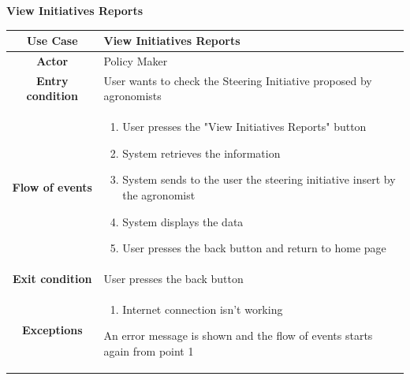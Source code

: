 \documentclass[table, 12pt]{article}
\begin{document}
\begin{itemize}
            \begin{table}[H]
                \item[] \textbf{View Initiatives Reports}
                \item[] 
                \centering
                \begin{tabular}{|c| m{}|}
                    \hline
                    \textbf{Use Case} & View Initiatives Reports\\ \hline
                    \textbf{Actor} & Policy Maker\\ \hline
                    \textbf{Entry condition} & User wants to check the Steering Initiative proposed by agronomists\\  \hline
                    \textbf{Flow of events} & \begin{enumerate}
                                                \item User presses the "View Initiatives Reports" button
                                                \item System retrieves the information
                                                \item System sends to the user the steering initiative insert by the agronomist
                                                \item System displays the data
                                                \item User presses the back button and return to home page
                                            \end{enumerate}\\ \hline
                    \textbf{Exit condition} & User presses the back button \\ \hline
                    \textbf{Exceptions} &   \begin{enumerate}
                        \item Internet connection isn't working
                    \end{enumerate}
                    An error message is shown and the flow of events starts again from point 1\\ \hline                    
                \end{tabular}
            \end{table}
                

\end{itemize}
\end{document}
